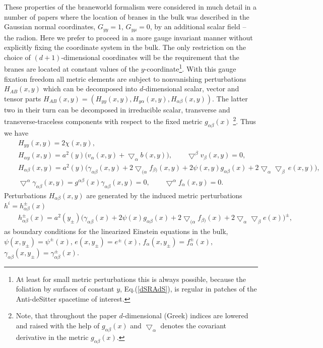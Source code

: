 \documentclass[a4paper,12pt]{article}
\newcommand{\za}{{\alpha}}   %
\newcommand{\zb}{{\beta}}    %
\newcommand{\ZA}{{A}}   %
\newcommand{\ZB}{{B}}   %
\newcommand{\ddim}{{d}}
\newcommand{\bnabla}{\bigtriangledown}  %
\begin{document}
These properties of the braneworld formalism were considered in
much detail in a number of papers \cite{BWEA,GarTan,ChGR} where
the location of branes in the bulk was described in the Gaussian
normal coordinates, $G_{yy}=1,\,G_{y\mu}=0$, by an additional
scalar field -- the radion. Here we prefer to proceed in a more
gauge invariant manner without explicitly fixing the coordinate
system in the bulk. The only restriction on the choice of
$(d+1)$-dimensional coordinates will be the requirement that the
branes are located at constant values of the
$y$-coordinate\footnote{At least for small metric perturbations
this is always possible, because the foliation by surfaces of
constant $y$, Eq.(\ref{dSRAdS}), is regular in patches of the
Anti-deSitter spacetime of interest.}. With this gauge fixation
freedom all metric elements are subject to nonvanishing
perturbations $H_{\ZA\ZB}(x,y)$ which can be decomposed into
$\ddim$-dimensional scalar, vector and tensor parts
$H_{\ZA\ZB}(x,y)=(H_{yy}(x,y),H_{y\alpha}(x,y),
H_{\alpha\beta}(x,y))$. The latter two in their turn can be
decomposed in irreducible scalar, transverse and
transverse-traceless components with respect to the fixed metric
$g_{\alpha\beta}(x)$ \footnote{Note, that throughout the paper
$\ddim$-dimensional (Greek) indices are lowered and raised with
the help of $g_{\za\zb}(x)$ and $\bnabla_{\za}$ denotes the
covariant derivative in the metric $g_{\za\zb}(x)$.}. Thus we have
    \begin{eqnarray}
    &&H_{yy}(x,y)=2\chi(x,y),            \label{lapse}\\
    &&H_{\za y}(x,y)=a^2(y)\big(v_\za(x,y)
    +\bnabla_\za b(x,y)\big),\qquad
    \bnabla^\zb v_\zb(x,y)=0,             \label{shift}\\
     &&H_{\za\zb}(x,y)=a^2(y)
     \big( \gamma_{\za\zb}(x,y)
     +2\bnabla_{(\za}\! f_{\zb)}(x,y)
     + 2\psi(x,y) g_{\za\zb}(x)
     + 2\bnabla_\za\!\bnabla_\zb\, e(x,y)\big),\nonumber\\
     &&\bnabla^\za\gamma_{\za\zb}(x,y)=
     g^{\za\zb}(x)\gamma_{\za\zb}(x,y)=0,\qquad
     \bnabla^\za f_\za(x,y)=0.      \label{Decomposition}
    \end{eqnarray}
Perturbations $H_{\za\zb}(x,y)$ are generated by the induced
metric perturbations $h^i=h_{\alpha\beta}^\pm(x)$
    \begin{eqnarray}
    &&h_{\alpha\beta}^\pm(x)=
    a^2(y_\pm)\Big(\gamma_{\alpha\beta}(x)
    + 2\psi(x) g_{\za\zb}(x)
    +2\bnabla_{(\za} f_{\zb)}(x)
    + 2\bnabla_\za\bnabla_\zb
    e(x)\Big)^\pm,        \label{Decomposition h}
   \end{eqnarray}
as boundary conditions for the linearized Einstein equations in
the bulk, $\psi(x,y_\pm)=\psi^\pm(x)$, $e(x,y_\pm)=e^\pm(x)$,
$f_\alpha(x,y_\pm)=f_\alpha^\pm(x)$,
$\gamma_{\za\zb}(x,y_\pm)=\gamma_{\za\zb}^\pm(x)$.
\end{document}
